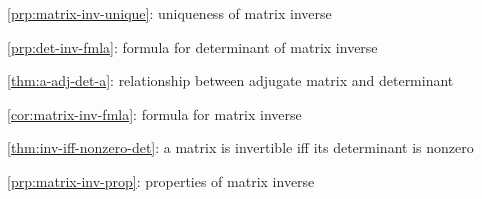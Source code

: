 \item \cref{prp:matrix-inv-unique}: uniqueness of matrix inverse
\item \cref{prp:det-inv-fmla}: formula for determinant of matrix inverse
\item \cref{thm:a-adj-det-a}: relationship between adjugate matrix and determinant
\item \cref{cor:matrix-inv-fmla}: formula for matrix inverse
\item \cref{thm:inv-iff-nonzero-det}: a matrix is invertible iff its determinant is nonzero
\item \cref{prp:matrix-inv-prop}: properties of matrix inverse

